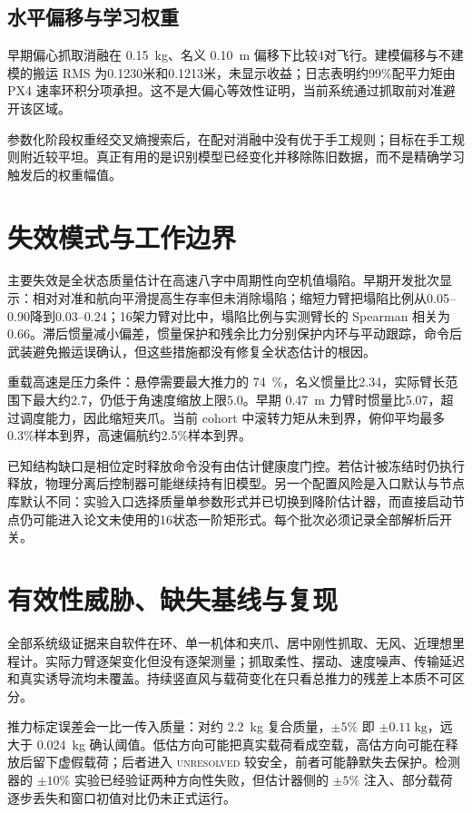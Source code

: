 \documentclass[11pt,UTF8,fontset=none]{ctexrep}
\begin{document}
\subsection{水平偏移与学习权重}

早期偏心抓取消融在 \SI{0.15}{\kg}、名义 \SI{0.10}{\meter} 偏移下比较4对飞行。建模偏移与不建模的搬运 RMS 为0.1230米和0.1213米，未显示收益；日志表明约99\%配平力矩由 PX4 速率环积分项承担。这不是大偏心等效性证明，当前系统通过抓取前对准避开该区域。

参数化阶段权重经交叉熵搜索后，在配对消融中没有优于手工规则；目标在手工规则附近较平坦。真正有用的是识别模型已经变化并移除陈旧数据，而不是精确学习触发后的权重幅值。

\section{失效模式与工作边界}

主要失效是全状态质量估计在高速八字中周期性向空机值塌陷。早期开发批次显示：相对对准和航向平滑提高生存率但未消除塌陷；缩短力臂把塌陷比例从0.05--0.90降到0.03--0.24；16架力臂对比中，塌陷比例与实测臂长的 Spearman 相关为0.66。滞后惯量减小偏差，惯量保护和残余比力分别保护内环与平动跟踪，命令后武装避免搬运误确认，但这些措施都没有修复全状态估计的根因。

重载高速是压力条件：悬停需要最大推力的 \SI{74}{\percent}，名义惯量比2.34，实际臂长范围下最大约2.7，仍低于角速度缩放上限5.0。早期 \SI{0.47}{\meter} 力臂时惯量比5.07，超过调度能力，因此缩短夹爪。当前 cohort 中滚转力矩从未到界，俯仰平均最多0.3\%样本到界，高速偏航约2.5\%样本到界。

已知结构缺口是相位定时释放命令没有由估计健康度门控。若估计被冻结时仍执行释放，物理分离后控制器可能继续持有旧模型。另一个配置风险是入口默认与节点库默认不同：实验入口选择质量单参数形式并已切换到降阶估计器，而直接启动节点仍可能进入论文未使用的16状态一阶矩形式。每个批次必须记录全部解析后开关。

\section{有效性威胁、缺失基线与复现}

全部系统级证据来自软件在环、单一机体和夹爪、居中刚性抓取、无风、近理想里程计。实际力臂逐架变化但没有逐架测量；抓取柔性、摆动、速度噪声、传输延迟和真实诱导流均未覆盖。持续竖直风与载荷变化在只看总推力的残差上本质不可区分。

推力标定误差会一比一传入质量：对约 \SI{2.2}{\kg} 复合质量，$\pm5\%$ 即 $\pm\SI{0.11}{\kg}$，远大于 \SI{0.024}{\kg} 确认阈值。低估方向可能把真实载荷看成空载，高估方向可能在释放后留下虚假载荷；后者进入 \textsc{unresolved} 较安全，前者可能静默失去保护。检测器的 $\pm10\%$ 实验已经验证两种方向性失败，但估计器侧的 $\pm5\%$ 注入、部分载荷逐步丢失和窗口初值对比仍未正式运行。
\end{document}
